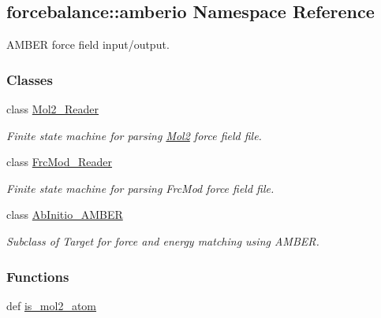 \hypertarget{namespaceforcebalance_1_1amberio}{\subsection{forcebalance\-:\-:amberio \-Namespace \-Reference}
\label{namespaceforcebalance_1_1amberio}
}


\-A\-M\-B\-E\-R force field input/output.  


\subsubsection*{\-Classes}
\begin{DoxyCompactItemize}
\item 
class \hyperlink{classforcebalance_1_1amberio_1_1Mol2__Reader}{\-Mol2\-\_\-\-Reader}
\begin{DoxyCompactList}\small\item\em \-Finite state machine for parsing \hyperlink{namespaceforcebalance_1_1Mol2}{\-Mol2} force field file. \end{DoxyCompactList}\item 
class \hyperlink{classforcebalance_1_1amberio_1_1FrcMod__Reader}{\-Frc\-Mod\-\_\-\-Reader}
\begin{DoxyCompactList}\small\item\em \-Finite state machine for parsing \-Frc\-Mod force field file. \end{DoxyCompactList}\item 
class \hyperlink{classforcebalance_1_1amberio_1_1AbInitio__AMBER}{\-Ab\-Initio\-\_\-\-A\-M\-B\-E\-R}
\begin{DoxyCompactList}\small\item\em \-Subclass of \-Target for force and energy matching using \-A\-M\-B\-E\-R. \end{DoxyCompactList}\end{DoxyCompactItemize}
\subsubsection*{\-Functions}
\begin{DoxyCompactItemize}
\item 
def \hyperlink{namespaceforcebalance_1_1amberio_af59589a24e815a11db69dcaa21c51659}{is\-\_\-mol2\-\_\-atom}
\end{DoxyCompactItemize}
